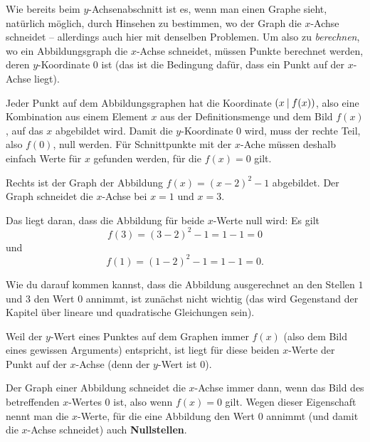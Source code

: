 \documentclass[../../main.tex]{subfiles}
\begin{document}
Wie bereits beim $y$-Achsenabschnitt ist es, wenn man einen Graphe sieht, natürlich möglich, durch Hinsehen zu bestimmen, wo der Graph die $x$-Achse schneidet -- allerdings auch hier mit denselben Problemen. Um also zu \emph{berechnen}, wo ein Abbildungsgraph die $x$-Achse schneidet, müssen Punkte berechnet werden, deren $y$-Koordinate $0$ ist (das ist die Bedingung dafür, dass ein Punkt auf der $x$-Achse liegt).

Jeder Punkt auf dem Abbildungsgraphen hat die Koordinate $\left(x \:\middle|\: f(x)\right)$, also eine Kombination aus einem Element $x$ aus der Definitionsmenge und dem Bild $f(x)$, auf das $x$ abgebildet wird. Damit die $y$-Koordinate $0$ wird, muss der rechte Teil, also $f(0)$, null werden. Für Schnittpunkte mit der $x$-Ache müssen deshalb einfach Werte für $x$ gefunden werden, für die $f(x)=0$ gilt.

\begin{example}{}
    Rechts ist der Graph der Abbildung $f(x)=(x-2)^2-1$ abgebildet. Der Graph schneidet die $x$-Achse bei $x=1$ und $x=3$. 
    
    Das liegt daran, dass die Abbildung für beide $x$-Werte null wird: Es gilt \[f(3)=(3-2)^2-1=1-1=0\] und \[f(1)=(1-2)^2-1=1-1=0.\]
    
    Wie du darauf kommen kannst, dass die Abbildung ausgerechnet an den Stellen $1$ und $3$ den Wert $0$ annimmt, ist zunächst nicht wichtig (das wird Gegenstand der Kapitel über lineare und quadratische Gleichungen sein).
    
    Weil der $y$-Wert eines Punktes auf dem Graphen immer $f(x)$ (also dem Bild eines gewissen Arguments) entspricht, ist liegt für diese beiden $x$-Werte der Punkt auf der $x$-Achse (denn der $y$-Wert ist $0$).
\end{example}

Der Graph einer Abbildung schneidet die $x$-Achse immer dann, wenn das Bild des betreffenden $x$-Wertes $0$ ist, also wenn $f(x)=0$ gilt. Wegen dieser Eigenschaft nennt man die $x$-Werte, für die eine Abbildung den Wert $0$ annimmt (und damit die $x$-Achse schneidet) auch \textbf{Nullstellen}.
\end{document}
